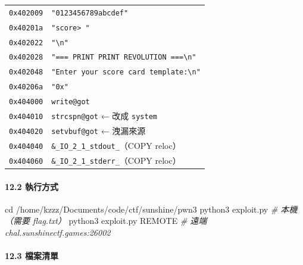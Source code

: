\documentclass[10pt,a4paper]{article}
\newenvironment{Shaded}{\begin{snugshade}}{\end{snugshade}}
\newcommand{\BuiltInTok}[1]{#1}
\newcommand{\CommentTok}[1]{\textcolor[rgb]{0.56,0.35,0.01}{\textit{#1}}}
\newcommand{\ExtensionTok}[1]{#1}
\newcommand{\NormalTok}[1]{#1}
\renewenvironment{Shaded}{%
  \def\FrameCommand{\fboxsep=3.2pt\colorbox{shadecolor}}%
  \MakeFramed{\advance\hsize-\width\FrameRestore\small}%
}{%
  \endMakeFramed
}
\begin{document}
{\begin{longtable}[]{@{}
  >{\raggedright\arraybackslash}p{}
  >{\raggedright\arraybackslash}p{}@{}}
\texttt{0x402009} & \texttt{"0123456789abcdef"} \\
\texttt{0x40201a} & \texttt{"score\textgreater{}\allowbreak{}\ \allowbreak{}"} \\
\texttt{0x402022} & \texttt{"\textbackslash{}\allowbreak{}n"} \\
\texttt{0x402028} &
\texttt{"===\ \allowbreak{}PRINT\ \allowbreak{}PRINT\ \allowbreak{}REVOLUTION\ \allowbreak{}===\textbackslash{}\allowbreak{}n"} \\
\texttt{0x402048} &
\texttt{"Enter\ \allowbreak{}your\ \allowbreak{}score\ \allowbreak{}card\ \allowbreak{}template:\allowbreak{}\textbackslash{}\allowbreak{}n"} \\
\texttt{0x40206a} & \texttt{"0x"} \\
\texttt{0x404000} & \texttt{write@got} \\
\texttt{0x404010} & \texttt{strcspn@got} ← 改成 \texttt{system} \\
\texttt{0x404020} & \texttt{setvbuf@got} ← 洩漏來源 \\
\texttt{0x404040} & \texttt{\&\allowbreak{}\_\allowbreak{}IO\_\allowbreak{}2\_\allowbreak{}1\_\allowbreak{}stdout\_\allowbreak{}}（COPY reloc） \\
\texttt{0x404060} & \texttt{\&\allowbreak{}\_\allowbreak{}IO\_\allowbreak{}2\_\allowbreak{}1\_\allowbreak{}stderr\_\allowbreak{}}（COPY reloc） \\
\end{longtable}
}

\paragraph{12.2 執行方式}\label{ux57f7ux884cux65b9ux5f0f}

\begin{Shaded}
\begin{Highlighting}[]
\BuiltInTok{cd}\NormalTok{ /home/kzzz/Documents/code/ctf/sunshine/pwn3}
\ExtensionTok{python3}\NormalTok{ exploit.py            }\CommentTok{\# 本機（需要 flag.txt）}
\ExtensionTok{python3}\NormalTok{ exploit.py REMOTE     }\CommentTok{\# 遠端 chal.sunshinectf.games:26002}
\end{Highlighting}
\end{Shaded}

\paragraph{12.3 檔案清單}\label{ux6a94ux6848ux6e05ux55ae}
\end{document}
